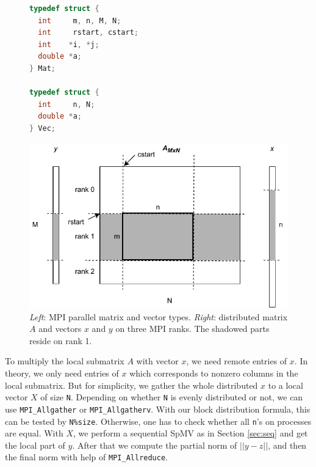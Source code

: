 \documentclass[submission]{eptcs}
\begin{document}
\vspace{-10pt}
\begin{figure}[h]
\begin{minipage}{0.35\textwidth}
\begin{lstlisting}[language=C]
typedef struct {
  int     m, n, M, N;
  int     rstart, cstart;
  int    *i, *j;
  double *a;
} Mat;

typedef struct {
  int     n, N;
  double *a;
} Vec;
\end{lstlisting}
\end{minipage}
\hfill
\begin{minipage}{0.60\textwidth}
    \includegraphics[width=1.0\textwidth]{figs/MPICSR.pdf}
\end{minipage}
\vspace{-10pt}
\caption{{\it Left}: MPI parallel matrix and vector types.
{\it Right}: distributed matrix $A$ and vectors $x$ and $y$ on three MPI ranks.
The shadowed parts reside on rank 1.}
\label{fig:mpicsr}
\vspace{-5pt}
\end{figure}


To multiply the local submatrix $A$ with vector $x$, we need remote entries of $x$. In theory, we only
need entries of $x$ which corresponds to nonzero columns in the local submatrix. But for simplicity,
we gather the whole distributed $x$ to a local vector $X$ of size {\tt N}.
Depending on whether {\tt N} is evenly distributed or not, we can use {\tt MPI_Allgather} or {\tt MPI_Allgatherv}.
With our block distribution formula, this can be tested by {\tt N\%size}. Otherwise,
one has to check whether all {\tt n}'s on processes are equal.
With $X$, we perform a sequential SpMV as in Section \ref{sec:seq} and get the local part of
$y$. After that we compute the partial norm of $||y - z||$, and
then the final norm with help of {\tt MPI_Allreduce}.
\end{document}
